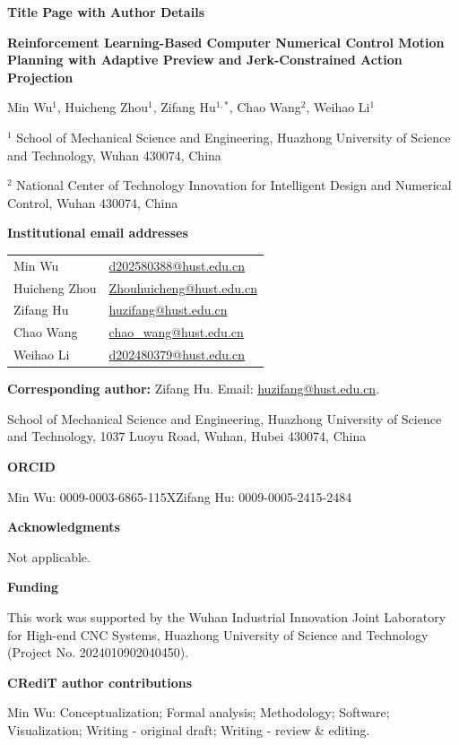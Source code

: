\documentclass[10pt,a4paper]{article}
\begin{document}
{\large\bfseries Title Page with Author Details}\par
\textbf{Reinforcement Learning-Based Computer Numerical Control Motion Planning with Adaptive Preview and Jerk-Constrained Action Projection}

Min Wu$^{1}$, Huicheng Zhou$^{1}$, Zifang Hu$^{1,*}$, Chao Wang$^{2}$, Weihao Li$^{1}$

$^{1}$ School of Mechanical Science and Engineering, Huazhong University of Science and Technology, Wuhan 430074, China

$^{2}$ National Center of Technology Innovation for Intelligent Design and Numerical Control, Wuhan 430074, China

\textbf{Institutional email addresses}\par
\begin{tabular}{@{}ll@{}}
Min Wu & \href{mailto:d202580388@hust.edu.cn}{d202580388@hust.edu.cn}\\
Huicheng Zhou & \href{mailto:Zhouhuicheng@hust.edu.cn}{Zhouhuicheng@hust.edu.cn}\\
Zifang Hu & \href{mailto:huzifang@hust.edu.cn}{huzifang@hust.edu.cn}\\
Chao Wang & \href{mailto:chao_wang@hust.edu.cn}{chao\_wang@hust.edu.cn}\\
Weihao Li & \href{mailto:d202480379@hust.edu.cn}{d202480379@hust.edu.cn}\\
\end{tabular}

\textbf{Corresponding author:} Zifang Hu. Email: \href{mailto:huzifang@hust.edu.cn}{huzifang@hust.edu.cn}.\par
School of Mechanical Science and Engineering, Huazhong University of Science and Technology, 1037 Luoyu Road, Wuhan, Hubei 430074, China

\textbf{ORCID}\par
Min Wu: 0009-0003-6865-115X\quad Zifang Hu: 0009-0005-2415-2484

\textbf{Acknowledgments}\par Not applicable.

\textbf{Funding}\par This work was supported by the Wuhan Industrial Innovation Joint Laboratory for High-end CNC Systems, Huazhong University of Science and Technology (Project No. 2024010902040450).

\textbf{CRediT author contributions}\par
Min Wu: Conceptualization; Formal analysis; Methodology; Software; Visualization; Writing - original draft; Writing - review \& editing.
\end{document}
